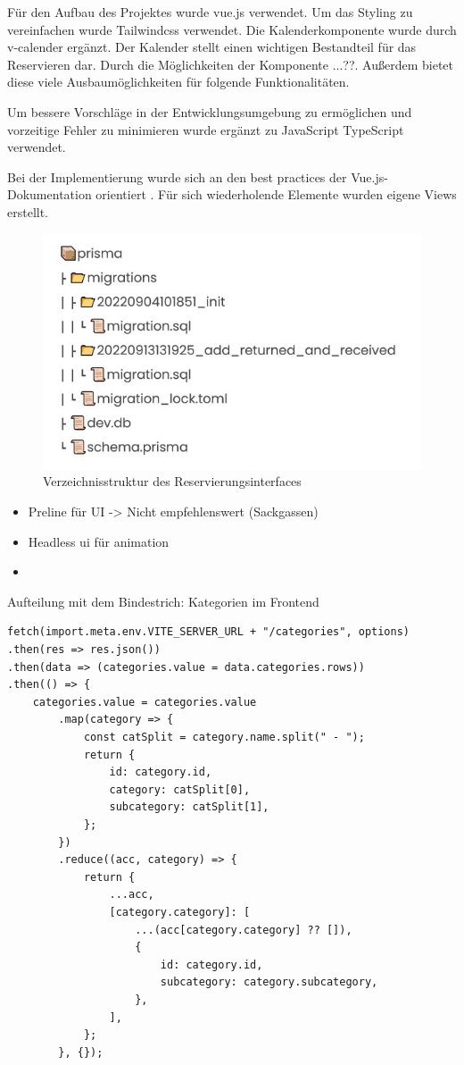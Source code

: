 Für den Aufbau des Projektes wurde vue.js verwendet. Um das Styling zu vereinfachen wurde
Tailwindcss verwendet. Die Kalenderkomponente wurde durch v-calender ergänzt. Der Kalender stellt
einen wichtigen Bestandteil für das Reservieren dar. Durch die Möglichkeiten der Komponente ...??.
Außerdem bietet diese viele Ausbaumöglichkeiten für folgende Funktionalitäten.

Um bessere Vorschläge in der Entwicklungsumgebung zu ermöglichen und vorzeitige Fehler zu minimieren
wurde ergänzt zu JavaScript TypeScript verwendet.



Bei der Implementierung wurde sich an den best practices der Vue.js-Dokumentation orientiert
. Für sich wiederholende Elemente wurden eigene Views erstellt.

\begin{figure}[h]
  \centering
  \includegraphics[scale=0.7]{Bilder/Db.jpg}
  \caption[Verzeichnisstruktur des Reservierungsinterfaces]{Verzeichnisstruktur des Reservierungsinterfaces}
  \label{fig:Komponenten}
\end{figure}




\begin{itemize}
  \item Preline für UI -> Nicht empfehlenswert (Sackgassen)
  \item Headless ui für animation
  \item 
\end{itemize}

Aufteilung mit dem Bindestrich: Kategorien im Frontend

\begin{lstlisting}
fetch(import.meta.env.VITE_SERVER_URL + "/categories", options)
.then(res => res.json())
.then(data => (categories.value = data.categories.rows))
.then(() => {
	categories.value = categories.value
		.map(category => {
			const catSplit = category.name.split(" - ");
			return {
				id: category.id,
				category: catSplit[0],
				subcategory: catSplit[1],
			};
		})
		.reduce((acc, category) => {
			return {
				...acc,
				[category.category]: [
					...(acc[category.category] ?? []),
					{
						id: category.id,
						subcategory: category.subcategory,
					},
				],
			};
		}, {});
\end{lstlisting}




